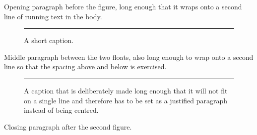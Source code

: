 \documentclass[a4paper,10pt]{article}
\begin{document}
Opening paragraph before the figure, long enough that it wraps onto a second
line of running text in the body.

\begin{figure}[h]
\centering
\rule{4cm}{2cm}
\caption{A short caption.}
\end{figure}

Middle paragraph between the two floats, also long enough to wrap onto a
second line so that the spacing above and below is exercised.

\begin{figure}[h]
\centering
\rule{3cm}{1.5cm}
\caption{A caption that is deliberately made long enough that it will not fit
on a single line and therefore has to be set as a justified paragraph instead
of being centred.}
\end{figure}

Closing paragraph after the second figure.
\end{document}
